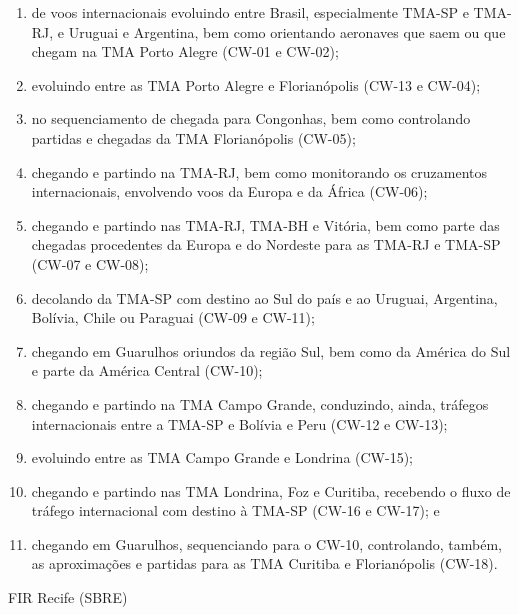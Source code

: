 \documentclass[
]{book}
\begin{document}
\begin{enumerate}
\def\labelenumi{\alph{enumi})}
\item
  de voos internacionais evoluindo entre Brasil, especialmente TMA-SP e TMA-RJ, e Uruguai e Argentina, bem como orientando aeronaves que saem ou que chegam na TMA Porto Alegre (CW-01 e CW-02);
\item
  evoluindo entre as TMA Porto Alegre e Florianópolis (CW-13 e CW-04);
\item
  no sequenciamento de chegada para Congonhas, bem como controlando partidas e chegadas da TMA Florianópolis (CW-05);
\item
  chegando e partindo na TMA-RJ, bem como monitorando os cruzamentos internacionais, envolvendo voos da Europa e da África (CW-06);
\item
  chegando e partindo nas TMA-RJ, TMA-BH e Vitória, bem como parte das chegadas procedentes da Europa e do Nordeste para as TMA-RJ e TMA-SP (CW-07 e CW-08);
\item
  decolando da TMA-SP com destino ao Sul do país e ao Uruguai, Argentina, Bolívia, Chile ou Paraguai (CW-09 e CW-11);
\item
  chegando em Guarulhos oriundos da região Sul, bem como da América do Sul e parte da América Central (CW-10);
\item
  chegando e partindo na TMA Campo Grande, conduzindo, ainda, tráfegos internacionais entre a TMA-SP e Bolívia e Peru (CW-12 e CW-13);
\item
  evoluindo entre as TMA Campo Grande e Londrina (CW-15);
\item
  chegando e partindo nas TMA Londrina, Foz e Curitiba, recebendo o fluxo de tráfego internacional com destino à TMA-SP (CW-16 e CW-17); e
\item
  chegando em Guarulhos, sequenciando para o CW-10, controlando, também, as aproximações e partidas para as TMA Curitiba e Florianópolis (CW-18).
\end{enumerate}

FIR Recife (SBRE)
\end{document}
